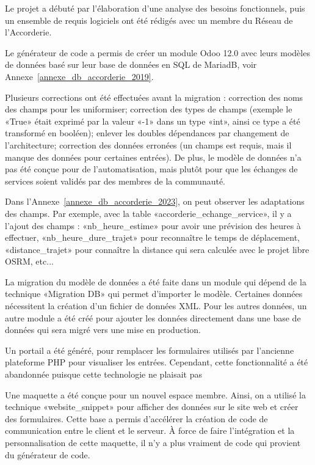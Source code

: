 Le projet a débuté par l'élaboration d'une analyse des besoins fonctionnels, puis un ensemble de requis logiciels ont été rédigés avec un membre du Réseau de l'Accorderie. %

Le générateur de code a permis de créer un module Odoo 12.0 avec leurs modèles de données basé sur leur base de données en SQL de MariadB, voir Annexe~\ref{annexe_db_accorderie_2019}.

Plusieurs corrections ont été effectuées avant la migration : correction des noms des champs pour les uniformiser; correction des types de champs (exemple le «True» était exprimé par la valeur «-1» dans un type «int», ainsi ce type a été transformé en booléen); enlever les doubles dépendances par changement de l’architecture; correction des données erronées (un champs est requis, mais il manque des données pour certaines entrées). De plus, le modèle de données n’a pas été conçue pour de l’automatisation, mais plutôt pour que les échanges de services soient validés par des membres de la communauté.

Dans l'Annexe~\ref{annexe_db_accorderie_2023}, on peut observer les adaptations des champs. Par exemple, avec la table «accorderie\_echange\_service», il y a l'ajout des champs : «nb\_heure\_estime» pour avoir une prévision des heures à effectuer, «nb\_heure\_dure\_trajet» pour reconnaître le temps de déplacement, «distance\_trajet» pour connaître la distance qui sera calculée avec le projet libre OSRM, etc...

La migration du modèle de données a été faite dans un module qui dépend de la technique «Migration DB» qui permet d'importer le modèle. Certaines données nécessitent la création d’un fichier de données XML. Pour les autres données, un autre module a été créé pour ajouter les données directement dans une base de données qui sera migré vers une mise en production.

Un portail a été généré, pour remplacer les formulaires utilisés par l'ancienne plateforme PHP pour visualiser les entrées. Cependant, cette fonctionnalité a été abandonnée puisque cette technologie ne plaisait pas

Une maquette a été conçue pour un nouvel espace membre. Ainsi, on a utilisé la technique «website\_snippet» pour afficher des données sur le site web et créer des formulaires. Cette base a permis d’accélérer la création de code de communication entre le client et le serveur. À force de faire l’intégration et la personnalisation de cette maquette, il n’y a plus vraiment de code qui provient du générateur de code.

